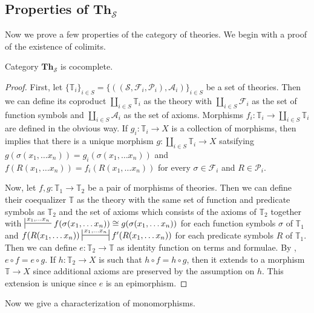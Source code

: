 \documentclass[reqno]{amsart}
\theoremstyle{definition}
\theoremstyle{remark}
\newcommand{\cat}[1]{\mathbf{#1}}
\newcommand{\Th}{\cat{Th}}
\numberwithin{figure}{section}
\begin{document}
\subsection{Properties of $\Th_\mathcal{S}$}

Now we prove a few properties of the category of theories.
We begin with a proof of the existence of colimits.

\begin{prop}
Category $\Th_\mathcal{S}$ is cocomplete.
\end{prop}
\begin{proof}
First, let $\{ \mathbb{T}_i \}_{i \in S} = \{ ((\mathcal{S},\mathcal{F}_i,\mathcal{P}_i),\mathcal{A}_i) \}_{i \in S}$ be a set of theories.
Then we can define its coproduct $\coprod\limits_{i \in S} \mathbb{T}_i$ as the theory with $\coprod\limits_{i \in S} \mathcal{F}_i$ as the set of function symbols and $\coprod\limits_{i \in S} \mathcal{A}_i$ as the set of axioms.
Morphisms $f_i : \mathbb{T}_i \to \coprod\limits_{i \in S} \mathbb{T}_i$ are defined in the obvious way.
If $g_i : \mathbb{T}_i \to X$ is a collection of morphisms, then  implies that there is a unique morphism $g : \coprod\limits_{i \in S} \mathbb{T}_i \to X$
    satsifying $g(\sigma(x_1, \ldots x_n)) = g_i(\sigma(x_1, \ldots x_n))$ and $f(R(x_1, \ldots x_n)) = f_i(R(x_1, \ldots x_n))$
    for every $\sigma \in \mathcal{F}_i$ and $R \in \mathcal{P}_i$.

Now, let $f,g : \mathbb{T}_1 \to \mathbb{T}_2$ be a pair of morphisms of theories.
Then we can define their coequalizer $\mathbb{T}$ as the theory with the same set of function and predicate symbols as $\mathbb{T}_2$ and the set of axioms which consists of the axioms of $\mathbb{T}_2$
together with $\sststile{}{x_1, \ldots x_n} f(\sigma(x_1, \ldots x_n)) \cong g(\sigma(x_1, \ldots x_n))$ for each function symbols $\sigma$ of $\mathbb{T}_1$
and $f(R(x_1, \ldots x_n)) \ssststile{}{x_1, \ldots x_n} f'(R(x_1, \ldots x_n))$ for each predicate symbols $R$ of $\mathbb{T}_1$.
Then we can define $e : \mathbb{T}_2 \to \mathbb{T}$ as identity function on terms and formulae.
By , $e \circ f = e \circ g$.
If $h : \mathbb{T}_2 \to X$ is such that $h \circ f = h \circ g$, then it extends to a morphism $\mathbb{T} \to X$ since additional axioms are preserved by the assumption on $h$.
This extension is unique since $e$ is an epimorphism.
\end{proof}

Now we give a characterization of monomorphisms.
\end{document}
